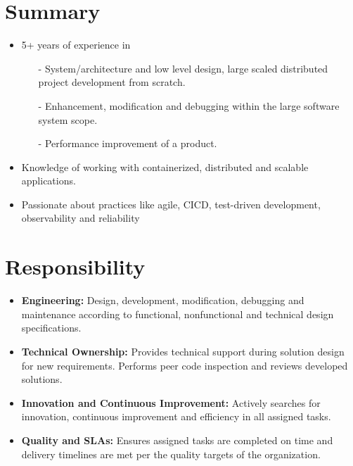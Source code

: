 \documentclass[a4paper,12pt]{article}
\begin{document}
\section{Summary}
\begin{itemize}[nosep,after=\strut, leftmargin=1em, itemsep=3pt]
    \item 5+ years of experience in
    \begin{itemize}
        \item[-] System/architecture and low level design, large scaled distributed project development from scratch.
        \item[-] Enhancement, modification and debugging within the large software system scope.
        \item[-] Performance improvement of a product.
    \end{itemize}
    \item Knowledge of working with containerized, distributed and scalable applications.
    \item Passionate about practices like agile, CICD, test-driven development, observability and reliability
\end{itemize}

\section{Responsibility}
\begin{itemize}[nosep,after=\strut, leftmargin=1em, itemsep=3pt]
    \item \textbf{Engineering:} Design, development, modification, debugging and maintenance according to functional, non­functional and technical design specifications.
    \item \textbf{Technical Ownership:} Provides technical support during solution design for new requirements. Performs peer code inspection and reviews developed solutions.
    \item \textbf{Innovation and Continuous Improvement:} Actively searches for innovation, continuous improvement and efficiency in all assigned tasks.
    \item \textbf{Quality and SLAs:} Ensures assigned tasks are completed on time and delivery timelines are met per the quality targets of the organization.
\end{itemize}
     
\end{document}
